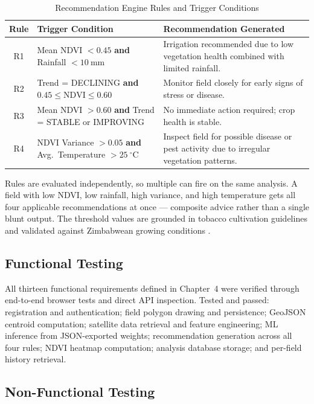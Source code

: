 \begin{table}[H]
  \centering
  \caption{Recommendation Engine Rules and Trigger Conditions}
  \label{tab:recrules}
  \begin{tabularx}{\textwidth}{c p{4.2cm} p{7.0cm}}
    \toprule
    \textbf{Rule} & \textbf{Trigger Condition} & \textbf{Recommendation Generated} \\
    \midrule
    R1 & Mean NDVI $< 0.45$ \textbf{and} Rainfall $< 10\ \text{mm}$ & Irrigation recommended due to low vegetation health combined with limited rainfall. \\[4pt]
    R2 & Trend = DECLINING \textbf{and} $0.45 \leq \text{NDVI} \leq 0.60$ & Monitor field closely for early signs of stress or disease. \\[4pt]
    R3 & Mean NDVI $> 0.60$ \textbf{and} Trend = STABLE or IMPROVING & No immediate action required; crop health is stable. \\[4pt]
    R4 & NDVI Variance $> 0.05$ \textbf{and} Avg.\ Temperature $> 25\ ^{\circ}\text{C}$ & Inspect field for possible disease or pest activity due to irregular vegetation patterns. \\
    \bottomrule
  \end{tabularx}
\end{table}

Rules are evaluated independently, so multiple can fire on the same analysis. A field with low NDVI, low rainfall, high variance, and high temperature gets all four applicable recommendations at once — composite advice rather than a single blunt output. The threshold values are grounded in tobacco cultivation guidelines and validated against Zimbabwean growing conditions \citep{timb2023}.

\subsection{Functional Testing}

All thirteen functional requirements defined in Chapter~4 were verified through end-to-end browser tests and direct API inspection. Tested and passed: registration and authentication; field polygon drawing and persistence; GeoJSON centroid computation; satellite data retrieval and feature engineering; ML inference from JSON-exported weights; recommendation generation across all four rules; NDVI heatmap computation; analysis database storage; and per-field history retrieval.

\subsection{Non-Functional Testing}

